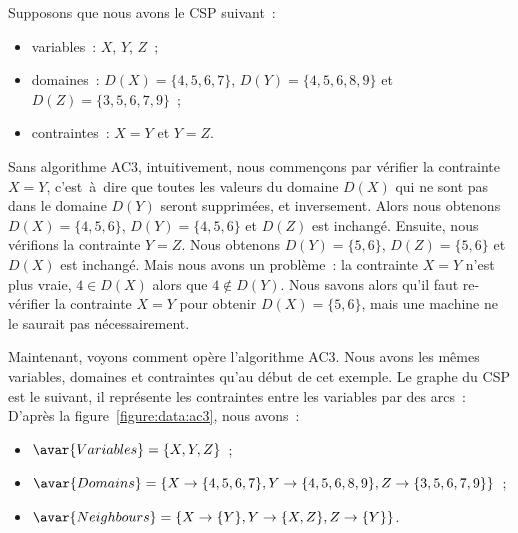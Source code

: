 \begin{example}
\label{example:data:ac3}

Supposons que nous avons le CSP suivant~:
%
\begin{itemize}

\item variables~: $X$, $Y$, $Z$~;

\item domaines~: $D(X) = \{4, 5, 6, 7\}$, $D(Y) = \{4, 5, 6, 8, 9\}$ et $D(Z) =
\{3, 5, 6, 7, 9\}$~;

\item contraintes~: $X = Y$ et $Y = Z$.

\end{itemize}

Sans algorithme AC3, intuitivement, nous commençons par vérifier la contrainte
$X = Y$, c'est~à~dire que toutes les valeurs du domaine $D(X)$ qui ne sont pas
dans le domaine $D(Y)$ seront supprimées, et inversement. Alors nous obtenons
$D(X) = \{4, 5, 6\}$, $D(Y) = \{4, 5, 6\}$ et $D(Z)$ est inchangé. Ensuite, nous
vérifions la contrainte $Y = Z$. Nous obtenons $D(Y) = \{5, 6\}$, $D(Z) = \{5,
6\}$ et $D(X)$ est inchangé. Mais nous avons un problème~: la contrainte $X = Y$
n'est plus vraie, $4 \in D(X)$ alors que $4 \notin D(Y)$. Nous savons alors
qu'il faut re-vérifier la contrainte $X = Y$ pour obtenir $D(X) = \{5, 6\}$,
mais une machine ne le saurait pas nécessairement.

Maintenant, voyons comment opère l'algorithme AC3. Nous avons les mêmes
variables, domaines et contraintes qu'au début de cet exemple. Le graphe du CSP
est le suivant, il représente les contraintes entre les variables par des arcs~:
%
%
D'après la figure~\ref{figure:data:ac3}, nous avons~:
%
\begin{itemize}

\item $\avar{Variables} = \{X, Y, Z\}$~;

\item $\avar{Domains} = \{X \rightarrow \{4, 5, 6, 7\}, Y \rightarrow \{4, 5, 6,
8, 9\}, Z \rightarrow \{3, 5, 6, 7, 9\}\}$~;

\item $\avar{Neighbours} = \{X \rightarrow \{Y\}, Y \rightarrow \{X, Z\}, Z \rightarrow \{Y\}\}$.


\end{itemize}
\end{example}
